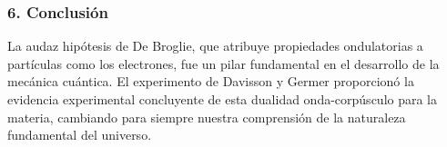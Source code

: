 \subsubsection*{6. Conclusión}
\begin{cajaconclusion}
La audaz hipótesis de De Broglie, que atribuye propiedades ondulatorias a partículas como los electrones, fue un pilar fundamental en el desarrollo de la mecánica cuántica. El experimento de Davisson y Germer proporcionó la evidencia experimental concluyente de esta dualidad onda-corpúsculo para la materia, cambiando para siempre nuestra comprensión de la naturaleza fundamental del universo.
\end{cajaconclusion}

\newpage
